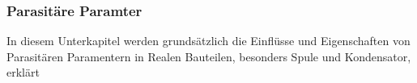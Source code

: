 \subsubsection{Parasitäre Paramter}\label{subsec:parasitparam}
In diesem Unterkapitel werden grundsätzlich die Einflüsse und Eigenschaften von Parasitären Paramentern in Realen Bauteilen, besonders Spule und Kondensator, erklärt

